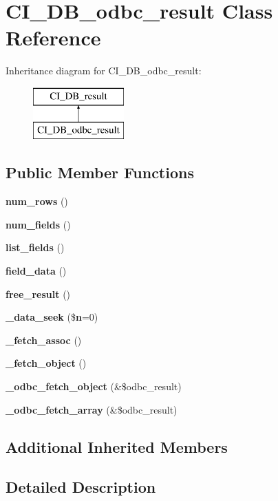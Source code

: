 \section{C\-I\-\_\-\-D\-B\-\_\-odbc\-\_\-result Class Reference}
\label{class_c_i___d_b__odbc__result}
Inheritance diagram for C\-I\-\_\-\-D\-B\-\_\-odbc\-\_\-result\-:\begin{figure}[H]
\begin{center}
\leavevmode
\includegraphics[height=2.000000cm]{class_c_i___d_b__odbc__result}
\end{center}
\end{figure}
\subsection*{Public Member Functions}
\begin{DoxyCompactItemize}
\item 
{\bf num\-\_\-rows} ()
\item 
{\bf num\-\_\-fields} ()
\item 
{\bf list\-\_\-fields} ()
\item 
{\bf field\-\_\-data} ()
\item 
{\bf free\-\_\-result} ()
\item 
{\bf \-\_\-data\-\_\-seek} (\${\bf n}=0)
\item 
{\bf \-\_\-fetch\-\_\-assoc} ()
\item 
{\bf \-\_\-fetch\-\_\-object} ()
\item 
{\bf \-\_\-odbc\-\_\-fetch\-\_\-object} (\&\$odbc\-\_\-result)
\item 
{\bf \-\_\-odbc\-\_\-fetch\-\_\-array} (\&\$odbc\-\_\-result)
\end{DoxyCompactItemize}
\subsection*{Additional Inherited Members}


\subsection{Detailed Description}


